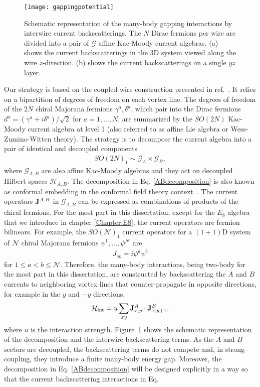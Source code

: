 \begin{figure}[htbp]
	\centering\texttt{[image: gappingpotential]}
	\caption[Schematic representation of the many-body gapping interactions by interwire current backscatterings.]{Schematic representation of the many-body gapping interactions by interwire current backscatterings. The $N$ Dirac fermions per wire are divided into a pair of $\mathcal{G}$ affine Kac-Moody current algebras. (a) shows the current backscatterings in the 3D system viewed along the wire $z$-direction. (b) shows the current backscatterings on a single $yz$ layer.}\label{fig:gappingpotential}
\end{figure}

Our strategy is based on the coupled-wire construction presented in ref.~\cite{PhysRevB.94.165142}. It relies on a bipartition of degrees of freedom on each vortex line. The degrees of freedom of the $2N$ chiral Majorana fermions $\gamma^a,\delta^a$, which pair into the Dirac fermions $d^a=(\gamma^a+i\delta^a)/\sqrt{2}$ for $a=1,\ldots,N$, are summarized by the $SO(2N)$ Kac-Moody current algebra at level 1 (also referred to as affine Lie algebra or Wess-Zumino-Witten theory). The strategy is to decompose the current algebra into a pair of identical and decoupled components \begin{align}SO(2N)_1\sim\mathcal{G}_A\times\mathcal{G}_B,\label{ABdecomposition}\end{align} where $\mathcal{G}_{A,B}$ are also affine Kac-Moody algebras and they act on decoupled Hilbert spaces $\mathcal{H}_{A,B}$. The decomposition in Eq. \eqref{ABdecomposition} is also known as conformal embedding in the conformal field theory context~\cite{bigyellowbook}. The current operators ${\bf J}^{A,B}$ in $\mathcal{G}_{A,B}$ can be expressed as combinations of products of the chiral fermions. For the most part in this dissertation, except for the $E_8$ algebra that we introduce in chapter \ref{Chapter:E8}, the current operators are fermion bilinears. For example, the $SO(\mathcal{N})_1$ current operators for a $(1+1)$D system of $\mathcal{N}$ chiral Majorana fermions $\psi^1,\ldots,\psi^{\mathcal{N}}$ are \begin{align}J_{ab}=i\psi^a\psi^b\label{SONcurrentdef}\end{align} for $1\leq a<b\leq\mathcal{N}$. Therefore, the many-body interactions, being two-body for the most part in this dissertation, are constructed by backscattering the $A$ and $B$ currents to neighboring vortex lines that counter-propagate in opposite directions, for example in the $y$ and $-y$ directions. \begin{align}\mathcal{H}_{\mathrm{int}}=u\sum_{xy}{\bf J}^A_{x,y}\cdot{\bf J}^B_{x,y+1},\label{Hint0}\end{align} where $u$ is the interaction strength. Figure~\ref{fig:gappingpotential} shows the schematic representation of the decomposition and the interwire backscattering terms. As the $A$ and $B$ sectors are decoupled, the backscattering terms do not compete and, in strong-coupling, they introduce a finite many-body energy gap. Moreover, the decomposition in Eq. \eqref{ABdecomposition} will be designed explicitly in a way so that the current backscattering interactions in Eq. 